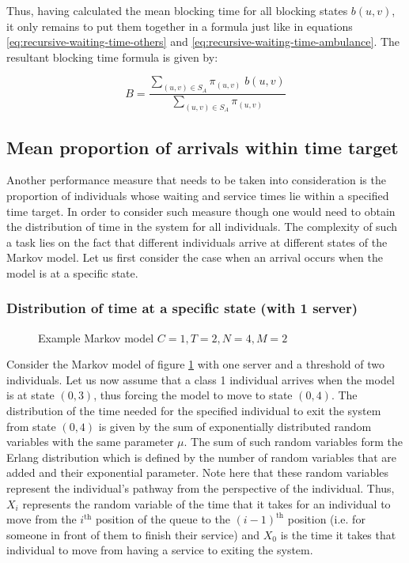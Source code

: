 Thus, having calculated the mean blocking time for all blocking states \(b(u,v)\), 
it only remains to put them together in a formula just like in equations 
\ref{eq:recursive-waiting-time-others} and \ref{eq:recursive-waiting-time-ambulance}.
The resultant blocking time formula is given by:

\begin{equation}\label{eq:algebraic-blocking-time}
    B = \frac{\sum_{(u,v) \in S_A} \pi_{(u,v)} \; b(u,v)}{\sum_{(u,v) \in S_A} 
    \pi_{(u,v)}}
\end{equation}


\subsection{Mean proportion of arrivals within time target}

Another performance measure that needs to be taken into consideration is the 
proportion of individuals whose waiting and service times lie within a specified 
time target.
In order to consider such measure though one would need to obtain the 
distribution of time in the system for all individuals. The complexity of such 
a task lies on the fact that different individuals arrive at different states of
the Markov model. Let us first consider the case when an arrival occurs when the
model is at a specific state.

\subsubsection{Distribution of time at a specific state (with 1 server)}

\begin{figure}[h]
    \centering
    \scalebox{0.75}{}
    \caption{Example Markov model \(C=1, T=2, N=4, M=2\)}
    \label{fig:distribution-of-time-at-specific-state-1-server}
\end{figure}

Consider the Markov model of figure 
\ref{fig:distribution-of-time-at-specific-state-1-server} with one server and a 
threshold of two individuals. 
Let us now assume that a class 1 individual arrives when the model is at state 
\((0,3)\), thus forcing the model to move to state \((0,4)\). 
The distribution of the time needed for the specified individual to exit the 
system from state \((0,4)\) is given by the sum of exponentially distributed 
random variables with the same parameter \(\mu\). 
The sum of such random variables form the Erlang distribution which is defined 
by the number of random variables that are added and their exponential 
parameter.
Note here that these random variables represent the individual's pathway from 
the perspective of the individual. 
Thus, \(X_i\) represents the random variable of the time that it takes for an
individual to move from the \(i^{\text{th}}\) position of the queue to the 
\((i-1)^{\text{th}}\) position (i.e. for someone in front of them to finish 
their service) and \(X_0\) is the time it takes that individual to move from 
having a service to exiting the system.



